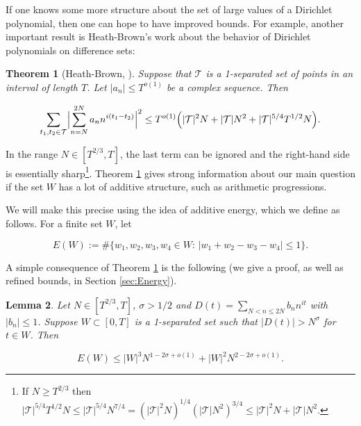 \documentclass{amsart}
\theoremstyle{plain}
\newtheorem{thrm}{Theorem}[section]
\newtheorem{lmm}[thrm]{Lemma}
\numberwithin{equation}{section}
\begin{document}
If one knows some more structure about the set of large values of a Dirichlet polynomial, then one can hope to have improved bounds. For example, another important result is Heath-Brown's work about the behavior of Dirichlet polynomials on difference sets:

%
%

\begin{thrm}[Heath-Brown, \cite{HB}]\label{thrm:HeathBrown}Suppose that $\mathcal{T}$ is a 1-separated set of points in an interval of length $T$.   Let $|a_n|\le T^{o(1)}$ be a complex sequence. Then

\[
\sum_{t_1,t_2\in \mathcal{T}}\Bigl|\sum_{n=N}^{2N} a_n n^{i(t_1-t_2)}\Bigr|^2\le T^{o(1)}\Bigl( |\mathcal{T}|^2N+|\mathcal{T}|N^2+|\mathcal{T}|^{5/4}T^{1/2}N\Bigr).
\]

\end{thrm}

%
%


In the range $N \in[T^{2/3}, T ]$, the last term can be ignored and the right-hand side is essentially sharp\footnote{If $N\ge T^{2/3}$ then $|\mathcal{T}|^{5/4}T^{1/2}N\le |\mathcal{T}|^{5/4}N^{7/4}=(|\mathcal{T}|^2N)^{1/4}(|\mathcal{T}|N^2)^{3/4}\le |\mathcal{T}|^2N+|\mathcal{T}|N^2$.}.   Theorem \ref{thrm:HeathBrown} gives strong information about our main question if the set $W$ has a lot of additive structure,  such as arithmetic progressions.

We will make this precise using the idea of additive energy,  which we define as follows.  For a finite set $W$,  let

\begin{equation}
E(W):=\#\{w_1,w_2,w_3,w_4\in W:\,|w_1+w_2-w_3-w_4|\le 1\}.
\label{eq:EnergyDef}
\end{equation}

A simple consequence of Theorem \ref{thrm:HeathBrown} is the following (we give a proof, as well as refined bounds, in Section \ref{sec:Energy}).

%
%


\begin{lmm}\label{lmm:BasicEnergy}
Let $N\in [T^{2/3},T]$, $\sigma > 1/2$ and $D(t) = \sum_{N<n\le 2N} b_n n^{i t }$ with $|b_n| \le 1$. Suppose $W \subset [0,T] $ is a 1-separated set such that $|D(t)| > N^\sigma$ for $t\in W$. Then

\[
E(W)\le |W|^3 N^{1-2\sigma+o(1)}+|W|^2 N^{2-2\sigma+o(1)}.
\]

\end{lmm}
\end{document}
